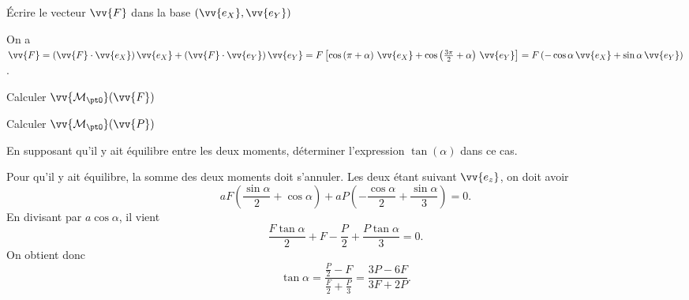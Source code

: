 

\begin{enonce}
	Écrire le vecteur $\vv{F}$ dans la base $(\vv{e_X},\vv{e_Y})$
\end{enonce}


\begin{corrige}
	On a $\vv{F} = (\vv{F}\cdot\vv{e_X})\,\vv{e_X}
		+ (\vv{F}\cdot\vv{e_Y})\,\vv{e_Y}
		= F\left[\cos\left(\pi + \alpha\right)\,\vv{e_X} + \cos\left(\frac{3\pi}2+\alpha\right)\,\vv{e_Y}\right]
		= F\left(-\cos\alpha\,\vv{e_X} + \sin\alpha\,\vv{e_Y}\right)$.
\end{corrige}

\begin{enonce}
	Calculer $\vv{\mathcal{M}_\ptO}(\vv{F})$
\end{enonce}




\begin{enonce}
	Calculer $\vv{\mathcal{M}_\ptO}(\vv{P})$
\end{enonce}




\begin{enonce}
	 En supposant qu'il y ait équilibre entre les deux moments, déterminer l'expression $\tan(\alpha)$ dans ce cas.\\
	 \mbox{}
\end{enonce}


\begin{corrige}
	Pour qu'il y ait équilibre, la somme des deux moments doit s'annuler. Les deux étant suivant $\vv{e_z}$, on doit avoir
	\[
		aF\left(\frac{\sin\alpha}{2} + \cos\alpha\right)
		+ aP\left(-\frac{\cos\alpha}2 + \frac{\sin\alpha}3\right) = 0.
	\]
	En divisant par $a\cos\alpha$, il vient
	\[
		\frac{F\tan\alpha}{2} + F - \frac{P}{2} + \frac{P\tan\alpha}{3} = 0.
	\]
	On obtient donc
	\[
		\tan\alpha = \frac{\frac{P}{2} - F}{\frac{F}{2}+\frac{P}{3}} = \frac{3P - 6F}{3F + 2P}.
	\]
\end{corrige}


